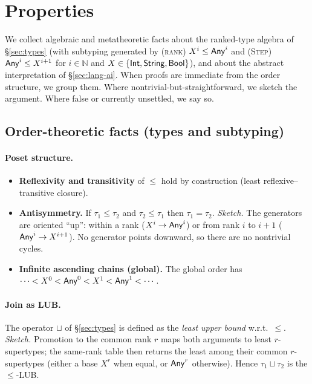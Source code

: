\section{Properties}
\label{sec:properties}

We collect algebraic and metatheoretic facts about the ranked-type algebra of \S\ref{sec:types}
(with subtyping generated by \textsc{(rank)} $X^{i}\le \mathsf{Any}^{i}$ and \textsc{(Step)} $\mathsf{Any}^{i}\le X^{i+1}$ for $i\in\mathbb{N}$ and $X\in\{\mathsf{Int},\mathsf{String},\mathsf{Bool}\}$),
and about the abstract interpretation of \S\ref{sec:lang-ai}.
When proofs are immediate from the order structure, we group them.
Where nontrivial-but-straightforward, we sketch the argument.
Where false or currently unsettled, we say so.

\subsection{Order-theoretic facts (types and subtyping)}

\paragraph{Poset structure.}
\begin{itemize}
\item \textbf{Reflexivity and transitivity} of $\le$ hold by construction (least reflexive–transitive closure).
\item \textbf{Antisymmetry.} If $\tau_1\le \tau_2$ and $\tau_2\le \tau_1$ then $\tau_1=\tau_2$.
\emph{Sketch.} The generators are oriented “up”: within a rank ($X^{i}\to\mathsf{Any}^{i}$) or from rank $i$ to $i{+}1$ ($\mathsf{Any}^{i}\to X^{i+1}$). No generator points downward, so there are no nontrivial cycles.
\item \textbf{Infinite ascending chains (global).} The global order has $\cdots < X^{0} < \mathsf{Any}^{0} < X^{1} < \mathsf{Any}^{1} < \cdots$.
\end{itemize}

\paragraph{Join as LUB.}
The operator $\sqcup$ of \S\ref{sec:types} is defined as the \emph{least upper bound} w.r.t.\ $\le$.
\emph{Sketch.} Promotion to the common rank $r$ maps both arguments to least $r$-supertypes; the same-rank table then returns the least among their common $r$-supertypes (either a base $X^{r}$ when equal, or $\mathsf{Any}^{r}$ otherwise). Hence $\tau_1\sqcup\tau_2$ is the $\le$-LUB.

